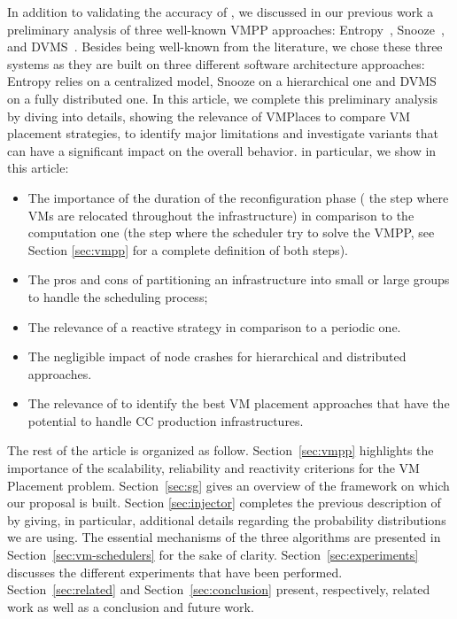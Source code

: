 In addition to validating the accuracy of \vmps, we discussed in our
previous work \cite{vmplaces:europar15} a
preliminary analysis of three well-known VMPP approaches:
Entropy~\cite{Hermenier:2009:ECM:1508293.1508300},
Snooze~\cite{feller:ccgrid12}, and DVMS~\cite{quesnel:cpe2012}.
Besides being well-known from the literature, we chose
these three systems as they are built on three different software
architecture approaches: Entropy relies on a centralized model, Snooze
on a hierarchical one and DVMS on a fully distributed one. In this
article, we complete this preliminary analysis by diving into
details, showing the relevance of VMPlaces to compare VM placement
strategies, to identify major limitations and investigate variants that can have a
significant impact on the overall behavior.
in particular, we show in this article:
\begin{itemize}
\item The importance of the duration of the reconfiguration phase (\ie
  the step where VMs are relocated throughout the infrastructure) in
  comparison to the computation one (\ie the step where the scheduler
  try to solve the VMPP, see Section \ref{sec:vmpp} for a complete
  definition of both steps).
\item The pros and cons of partitioning an infrastructure into small or large
  groups to handle the scheduling process;
\item The relevance of a reactive strategy in comparison to a periodic
  one.
\item The negligible impact of node crashes for hierarchical and
  distributed approaches.
\item The relevance of \vmps to identify the best VM placement
  approaches that have the potential to handle CC production infrastructures.
\end{itemize}



The rest of the article is
organized as follow. Section~\ref{sec:vmpp} highlights the importance
of the scalability, reliability and reactivity criterions for the VM
Placement problem.
Section~\ref{sec:sg} gives an overview of the \sg
framework on which our proposal is built. Section \ref{sec:injector}
completes the previous  description of \vmps by giving, in particular,
additional details regarding the probability distributions we are using.
The essential mechanisms of the three
algorithms are presented in
Section~\ref{sec:vm-schedulers} for the sake of clarity.
 Section~\ref{sec:experiments} discusses the different experiments
 that have been performed. Section~\ref{sec:related} and
Section~\ref{sec:conclusion} present, respectively, related work as
well as a conclusion and future work.

